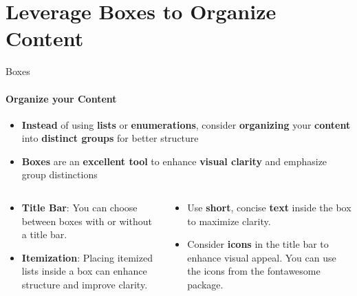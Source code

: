 \documentclass[aspectratio=169]{beamer}
\begin{document}
\section{Leverage \textbf{Boxes} to Organize Content}

\begin{frame}
    \agenda     
\end{frame}


\begin{frame}{Boxes}
    \framesubtitle{Organize your Content}

    \begin{coloredblock}[yellow]
        \begin{itemize}
            \item \textbf{Instead} of using \textbf{lists} or \textbf{enumerations}, consider \textbf{organizing} your \textbf{content} into \textbf{distinct groups} for better structure
            \item \textbf{Boxes} are an \textbf{excellent tool} to enhance \textbf{visual clarity} and emphasize group distinctions
        \end{itemize}
    \end{coloredblock}

    \begin{columns}
        \begin{column}{0.49\textwidth}
            \begin{coloredblock}
                \begin{itemize}
                    \item \textbf{Title Bar}: You can choose between boxes with or without a title bar.
                    \item \textbf{Itemization}: Placing itemized lists inside a box can enhance structure and improve clarity.
                \end{itemize}
            \end{coloredblock}
        \end{column}
        \begin{column}{0.49\textwidth}
            \begin{coloredblock}
                \begin{itemize}
                    \item Use \textbf{short}, concise \textbf{text} inside the box to maximize clarity.
                    \item Consider \textbf{icons} in the title bar to enhance visual appeal. You can use the icons from the fontawesome package.
                \end{itemize}
            \end{coloredblock}
        \end{column}
    \end{columns}

\end{frame}
\end{document}
